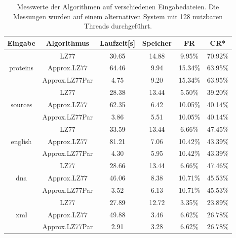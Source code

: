 \begin{table}[ht]
    \centering
    \caption{Messwerte der Algorithmen auf verschiedenen Eingabedateien. Die Messungen wurden auf einem alternativen System mit 128 nutzbaren Threads durchgeführt.}
    \begin{tabular} { |c|c|c|c|c|c| }
        \hline
        \textbf{Eingabe} & \textbf{Algorithmus} & \textbf{Laufzeit[s]} & \textbf{Speicher} & \textbf{FR} & \textbf{CR*} \\
        \hline
        & LZ77 & 30.65 & 14.88 & 9.95\% & 70.92\% \\
        proteins & Approx.LZ77 & 64.46 & 9.94 & 15.34\% & 63.95\% \\
        & Approx.LZ77Par & 4.75 & 9.20 & 15.34\% & 63.95\% \\
        \hline
        & LZ77 & 28.38 & 13.44 & 5.50\% & 39.20\% \\
        sources & Approx.LZ77 & 62.35 & 6.42 & 10.05\% & 40.14\% \\
        & Approx.LZ77Par & 3.86 & 5.51 & 10.05\% & 40.14\% \\
        \hline
        & LZ77 & 33.59 & 13.44 & 6.66\% & 47.45\% \\
        english & Approx.LZ77 & 81.21 & 7.06 & 10.42\% & 43.39\% \\
        & Approx.LZ77Par & 4.30 & 5.95 & 10.42\% & 43.39\% \\
        \hline
        & LZ77 & 28.66 & 13.44 & 6.66\% & 47.46\% \\
        dna & Approx.LZ77 & 46.06 & 8.38 & 10.71\% & 45.53\% \\
        & Approx.LZ77Par & 3.52 & 6.13 & 10.71\% & 45.53\% \\
        \hline
        & LZ77 & 27.89 & 12.72 & 3.35\% & 23.89\% \\
        xml & Approx.LZ77 & 49.88 & 3.46 & 6.62\% & 26.78\% \\
        & Approx.LZ77Par & 2.91 & 3.28 & 6.62\% & 26.78\% \\
        \hline
    \end{tabular}
\end{table}

